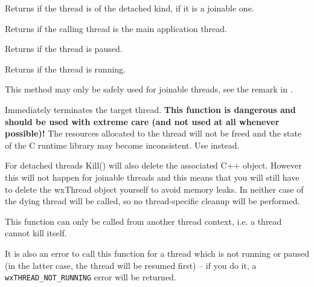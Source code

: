 \label{wxthreadisdetached}


Returns \true if the thread is of the detached kind, \false if it is a joinable
one.


\label{wxthreadismain}


Returns \true if the calling thread is the main application thread.


\label{wxthreadispaused}


Returns \true if the thread is paused.


\label{wxthreadisrunning}


Returns \true if the thread is running.

This method may only be safely used for joinable threads, see the remark in 
.


\label{wxthreadkill}


Immediately terminates the target thread. {\bf This function is dangerous and should
be used with extreme care (and not used at all whenever possible)!} The resources
allocated to the thread will not be freed and the state of the C runtime library
may become inconsistent. Use  instead.

For detached threads Kill() will also delete the associated C++ object.
However this will not happen for joinable threads and this means that you will
still have to delete the wxThread object yourself to avoid memory leaks.
In neither case  of the dying thread will be
called, so no thread-specific cleanup will be performed.

This function can only be called from another thread context, i.e. a thread
cannot kill itself.

It is also an error to call this function for a thread which is not running or
paused (in the latter case, the thread will be resumed first) -- if you do it,
a {\tt wxTHREAD\_NOT\_RUNNING} error will be returned.


\label{wxthreadonexit}

